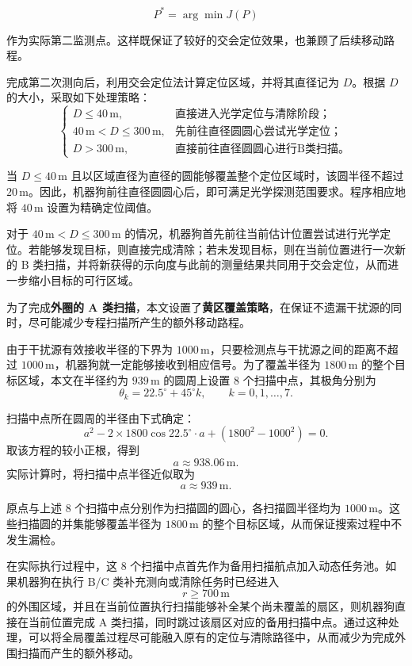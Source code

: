 \documentclass[withoutpreface,bwprint]{cumcmthesis}
\begin{document}
$$ P^*=\arg\min J(P) $$

作为实际第二监测点。这样既保证了较好的交会定位效果，也兼顾了后续移动路程。

完成第二次测向后，利用交会定位法计算定位区域，并将其直径记为 $D$。根据 $D$ 的大小，采取如下处理策略：
\[
\begin{cases}
D\leq 40\,\mathrm{m}, 
& \text{直接进入光学定位与清除阶段；}\\[2mm]
40\,\mathrm{m}<D\leq 300\,\mathrm{m},
& \text{先前往直径圆圆心尝试光学定位；}\\[2mm]
D>300\,\mathrm{m},
& \text{直接前往直径圆圆心进行B类扫描。}
\end{cases}
\]

当 $D\leq 40\,\mathrm{m}$ 且以区域直径为直径的圆能够覆盖整个定位区域时，该圆半径不超过 $20\,\mathrm{m}$。因此，机器狗前往直径圆圆心后，即可满足光学探测范围要求。程序相应地将 $40\,\mathrm{m}$ 设置为精确定位阈值。

对于 $40\,\mathrm{m}<D\leq 300\,\mathrm{m}$ 的情况，机器狗首先前往当前估计位置尝试进行光学定位。若能够发现目标，则直接完成清除；若未发现目标，则在当前位置进行一次新的 B 类扫描，并将新获得的示向度与此前的测量结果共同用于交会定位，从而进一步缩小目标的可行区域。

为了完成\textbf{外圈的 A 类扫描}，本文设置了\textbf{黄区覆盖策略}，在保证不遗漏干扰源的同时，尽可能减少专程扫描所产生的额外移动路程。

由于干扰源有效接收半径的下界为 $1000\,\mathrm{m}$，只要检测点与干扰源之间的距离不超过 $1000\,\mathrm{m}$，机器狗就一定能够接收到相应信号。为了覆盖半径为 $1800\,\mathrm{m}$ 的整个目标区域，本文在半径约为 $939\,\mathrm{m}$ 的圆周上设置 $8$ 个扫描中点，其极角分别为
\[
\theta_k
=
22.5^\circ+45^\circ k,
\qquad
k=0,1,\ldots,7.
\]

扫描中点所在圆周的半径由下式确定：
\[
a^2
-2\times1800\cos 22.5^\circ\cdot a
+\left(1800^2-1000^2\right)
=0.
\]
取该方程的较小正根，得到
\[
a\approx938.06\,\mathrm{m}.
\]
实际计算时，将扫描中点半径近似取为
\[
a\approx939\,\mathrm{m}.
\]

原点与上述 $8$ 个扫描中点分别作为扫描圆的圆心，各扫描圆半径均为 $1000\,\mathrm{m}$。这些扫描圆的并集能够覆盖半径为 $1800\,\mathrm{m}$ 的整个目标区域，从而保证搜索过程中不发生漏检。

在实际执行过程中，这 $8$ 个扫描中点首先作为备用扫描航点加入动态任务池。如果机器狗在执行 B/C 类补充测向或清除任务时已经进入
\[
r\geq700\,\mathrm{m}
\]
的外围区域，并且在当前位置执行扫描能够补全某个尚未覆盖的扇区，则机器狗直接在当前位置完成 A 类扫描，同时跳过该扇区对应的备用扫描中点。通过这种处理，可以将全局覆盖过程尽可能融入原有的定位与清除路径中，从而减少为完成外围扫描而产生的额外移动。
\end{document}

